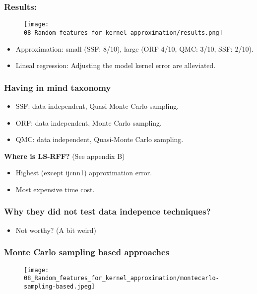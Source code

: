 \begin{frame}
  \frametitle{Results:}

  \begin{figure}[t]
    \texttt{[image: 08\_Random\_features\_for\_kernel\_approximation/results.png]}
    \centering
  \end{figure}
  \begin{itemize}
    \item Approximation: small (SSF: 8/10), large (ORF 4/10, QMC: 3/10, SSF:  2/10). 
    \item Lineal regression: Adjusting the model kernel error are alleviated. 
  \end{itemize}
  

\end{frame}

\begin{frame}
  \frametitle{Having in mind taxonomy}

  \begin{itemize}
    \item SSF: data independent, Quasi-Monte Carlo sampling. 
    \item ORF: data independent, Monte Carlo sampling.  
    \item  QMC:  data independent, Quasi-Monte Carlo sampling.
  \end{itemize}

  \textbf{Where is LS-RFF?} (See appendix B)
  \begin{itemize}
    \item Highest (except ijcnn1) approximation error. 
    \item Most expensive time cost. 
  \end{itemize}

\end{frame}

\begin{frame}
  \frametitle{Why they did not test data indepence techniques? }
\begin{itemize}
  \item Not worthy? (A bit weird) 
\end{itemize}
  
\end{frame}


\begin{frame}
  \frametitle{Monte Carlo sampling based approaches }
\begin{figure}[t]
  \texttt{[image: 08\_Random\_features\_for\_kernel\_approximation/montecarlo-sampling-based.jpeg]}
  \centering
\end{figure}


\end{frame}


